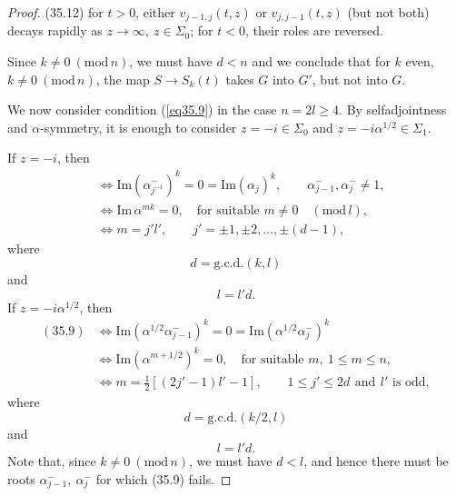 \documentclass{surv-l}
\theoremstyle{plain}
\theoremstyle{definition}
\numberwithin{equation}{chapter}
\begin{document}
\begin{proof}
(35.12) for $t>0$, either $v_{{j-1},j}(t, z)$ or $v_{j,j-1}(t, z)$ (but not both) decays rapidly as $ z\rightarrow\infty,\ z\in\Sigma_{0}$; for $t<0$, their roles are reversed.

Since $k\neq 0\ (\mathrm{mod}\, n)$, we must have $d<n$ and we conclude that for $k$ even, $k\neq 0\ (\mathrm{mod}\, n)$, the map $S\rightarrow S_{k}(t)$ takes $G$ into $G'$, but not into $G$.

We now consider condition (\ref{eq35.9}) in the case $n=2l\geq 4$. By selfadjointness and $\alpha$-symmetry, it is enough to consider $z=-i\in\Sigma_{0}$ and $z=-i\alpha^{1/2}\in\Sigma_{1}$.

If $z=-i$, then
\begin{align*}
\tag*{(35.9)}&\Leftrightarrow\mathrm{Im}(\alpha_{j^{-1}}^{-})^{k}=0=\mathrm{Im}(\alpha_{j})^{k},\qquad \alpha_{j-1}^{-}, \alpha_{j}^{-}\neq 1,\\
&\Leftrightarrow\mathrm{Im}\,\alpha^{mk}=0,\quad \text{for suitable } m\neq 0\quad(\mathrm{mod}\, l),\\
&\Leftrightarrow m=j'l',\qquad j'=\pm1,\pm2,\ldots,\pm(d-1),
\end{align*}
where
\setcounter{equation}{12}
\begin{equation}\label{eq35.13}
d=\mathrm{g.c.d.} (k, l)
\end{equation}
and
\begin{equation}\label{eq35.14}
l=l'd.
\end{equation}
If $z=-i\alpha^{1/2}$, then
\begin{align*}
(35.9)&\Leftrightarrow\mathrm{Im}(\alpha^{1/2}\alpha_{j-1}^{-})^{k}=0=\mathrm{ Im}(\alpha^{1/2}\alpha_{j}^{-})^{k}\\
&\Leftrightarrow\mathrm{Im}(\alpha^{m+1/2})^{k}=0,\quad \text{for suitable } m,\ 1\leq m\leq n,\\
&\displaystyle \Leftrightarrow m=\tfrac{1}{2}[(2j'-1)l'-1],\qquad 1\leq j'\leq 2d\,\ \mathrm{and}\,\ l' \text{ is odd},
\end{align*}
where
\begin{equation}\label{eq35.15}
d=\mathrm{g.c.d.}(k/2, l)
\end{equation}
and
\begin{equation}\label{eq35.16}
l=l'd.
\end{equation}
Note that, since $k\neq 0\ (\mathrm{mod}\, n)$, we must have $d<l$, and hence there must be roots $\alpha_{j-1}^{-},\ \alpha_{j}^{-}$ for which (35.9) fails.


\end{proof}
\end{document}
